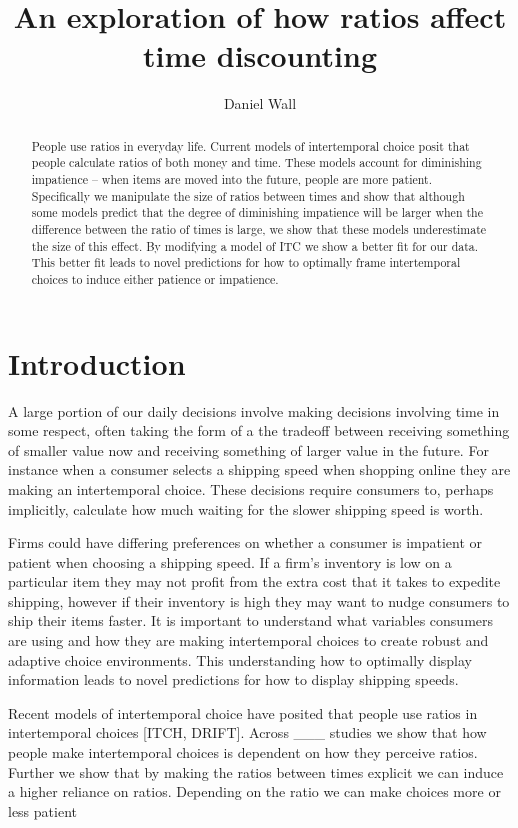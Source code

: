 \documentclass[]{article}
\title{An exploration of how ratios affect time discounting}
\author{Daniel Wall}
\begin{document}
\maketitle

\begin{abstract}
	People use ratios in everyday life. 
	Current models of intertemporal choice posit that people calculate ratios of both money and time. 
	These models account for diminishing impatience -- when items are moved into the future, people are more patient. 
	Specifically we manipulate the size of ratios between times and show that although some models predict that the degree of diminishing impatience will be larger when the difference between the ratio of times is large, we show that these models underestimate the size of this effect. 
	By modifying a model of ITC we show a better fit for our data. 
	This better fit leads to novel predictions for how to optimally frame intertemporal choices to induce either patience or impatience. 
\end{abstract}

\section{Introduction}


A large portion of our daily decisions involve making decisions involving time in some respect, often taking the form of a the tradeoff between receiving something of smaller value now and receiving something of larger value in the future. 
For instance when a consumer selects a shipping speed when shopping online they are making an intertemporal choice.
These decisions require consumers to, perhaps implicitly, calculate how much waiting for the slower shipping speed is worth.  


 Firms could have differing preferences on whether a consumer is impatient or patient when choosing a shipping speed. 
 If a firm’s inventory is low on a particular item they may not profit from the extra cost that it takes to expedite shipping, however if their inventory is high they may want to nudge consumers to ship their items faster. 
 It is important to understand what variables consumers are using and how they are making intertemporal choices to create robust and adaptive choice environments. 
This understanding how to optimally display information leads to novel predictions for how to display shipping speeds. 

Recent models of intertemporal choice have posited that people use ratios in intertemporal choices [ITCH, DRIFT]. 
Across ___ studies we show that how people make intertemporal choices is dependent on how they perceive ratios. 
Further we show that by making the ratios between times explicit we can induce a higher reliance on ratios. 
Depending on the ratio we can make choices more or less patient 
\end{document}
